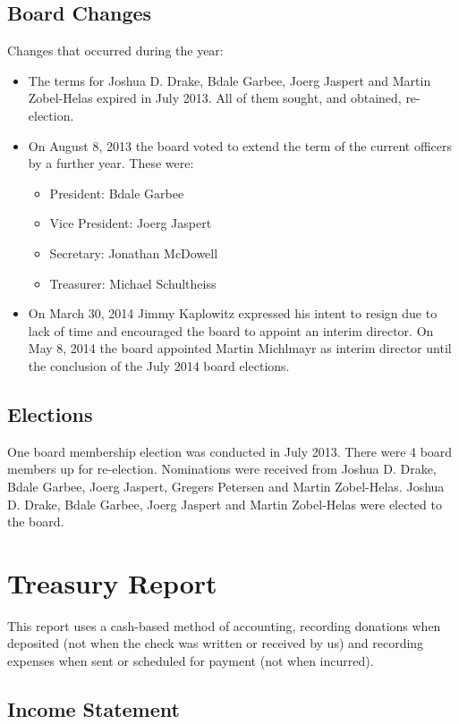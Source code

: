 \documentclass[letterpaper]{report}
\begin{document}
\section{Board Changes}

Changes that occurred during the year:

\begin{itemize}
\item The terms for Joshua D. Drake, Bdale Garbee, Joerg Jaspert and
Martin Zobel-Helas expired in July 2013. All of them sought, and
obtained, re-election.
\item On August 8, 2013 the board voted to extend the term of the current
officers by a further year. These were:
\begin{itemize}
\item President: Bdale Garbee
\item Vice President: Joerg Jaspert
\item Secretary: Jonathan McDowell
\item Treasurer: Michael Schultheiss
\end{itemize}
\item On March 30, 2014 Jimmy Kaplowitz expressed his intent to resign
due to lack of time and encouraged the board to appoint an interim
director.  On May 8, 2014 the board appointed Martin Michlmayr as
interim director until the conclusion of the July 2014 board elections.
\end{itemize}

\section{Elections}

One board membership election was conducted in July 2013. There were 4
board members up for re-election.  Nominations were received from Joshua D.
Drake, Bdale Garbee, Joerg Jaspert, Gregers Petersen and Martin
Zobel-Helas.  Joshua D. Drake, Bdale Garbee, Joerg Jaspert and Martin
Zobel-Helas were elected to the board.

\chapter{Treasury Report}

This report uses a cash-based method of accounting, recording donations when
deposited (not when the check was written or received by us) and recording
expenses when sent or scheduled for payment (not when incurred).

\section{Income Statement}
\end{document}
